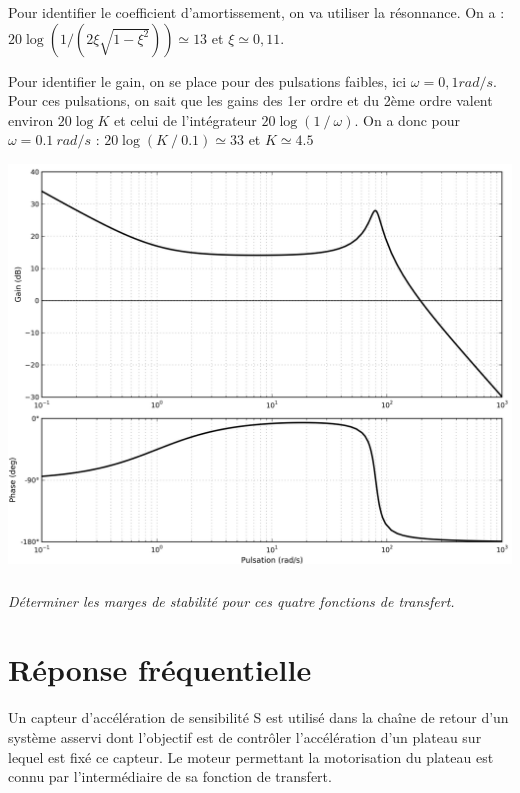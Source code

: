 \documentclass[10pt,fleqn]{article} %
\begin{document}
\begin{multicols}{2}
\begin{corrige}
Pour identifier le coefficient d’amortissement, on va utiliser la résonnance. On a :
$20\log(1/(2\xi\sqrt{1-\xi^2 }))\simeq 13$ et $\xi\simeq 0,11$.

Pour identifier le gain, on se place pour des pulsations faibles, ici $\omega=0,1 rad/s$. Pour ces pulsations, on sait que les gains des 1er ordre et du 2ème ordre valent environ $20\log K$ et celui de l’intégrateur $20\log(1⁄\omega)$. On a donc pour $\omega=\SI{0,1}{rad/s}$ :
$20\log(K⁄0.1)\simeq 33$ et $K\simeq4.5$

\end{corrige}
\else

\begin{center}
\includegraphics[width=\linewidth]{images/img_02}
\end{center}
\fi

\subparagraph{}
\textit{Déterminer les marges de stabilité pour ces quatre fonctions de transfert.}

%
%
%
%

\section*{Réponse fréquentielle}
\setcounter{exo}{0}
Un capteur d'accélération de sensibilité S est utilisé dans la chaîne de retour d'un système asservi dont l'objectif est de contrôler l'accélération d'un plateau sur lequel est fixé ce capteur. Le moteur permettant la motorisation du plateau est connu par l'intermédiaire de sa fonction de transfert. 



\end{multicols}
\end{document}
